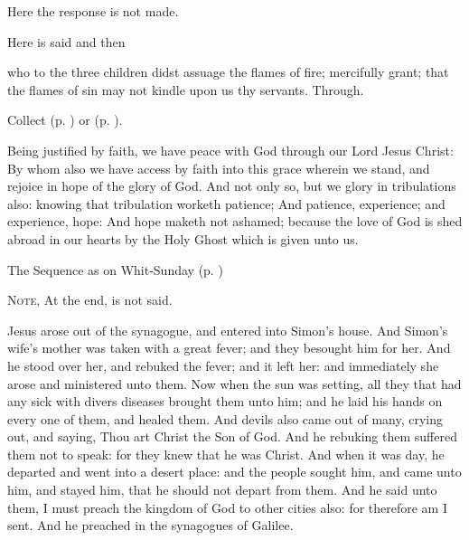 \begin{rubric}
    Here the response  is not made.
\end{rubric}


\begin{rubric}
	Here is said  and then 
\end{rubric}

\collect
{}
{} who to the three children didst assuage the flames of fire; mercifully grant; that the flames of sin may not kindle upon us thy servants. Through.
\begin{rubric}
     Collect  (p. \pageref{SPAgainst}) or  (p. \pageref{SPChiefBishop}).
\end{rubric}

 Being justified by faith, we have peace with God through our Lord Jesus Christ: By whom also we have access by faith into this grace wherein we stand, and rejoice in hope of the glory of God. And not only so, but we glory in tribulations also: knowing that tribulation worketh patience; And patience, experience; and experience, hope: And hope maketh not ashamed; because the love of God is shed abroad in our hearts by the Holy Ghost which is given unto us.


\begin{rubric}
{The Sequence as on Whit-Sunday (p. \pageref{WhitSeq})}
\end{rubric}

\begin{rubric}
    \textsc{Note,} At the end,  is not said.
\end{rubric}

 Jesus arose out of the synagogue, and entered into Simon's house. And Simon's wife's mother was taken with a great fever; and they besought him for her. And he stood over her, and rebuked the fever; and it left her: and immediately she arose and ministered unto them. Now when the sun was setting, all they that had any sick with divers diseases brought them unto him; and he laid his hands on every one of them, and healed them. And devils also came out of many, crying out, and saying, Thou art Christ the Son of God. And he rebuking them suffered them not to speak: for they knew that he was Christ. And when it was day, he departed and went into a desert place: and the people sought him, and came unto him, and stayed him, that he should not depart from them. And he said unto them, I must preach the kingdom of God to other cities also: for therefore am I sent. And he preached in the synagogues of Galilee.

